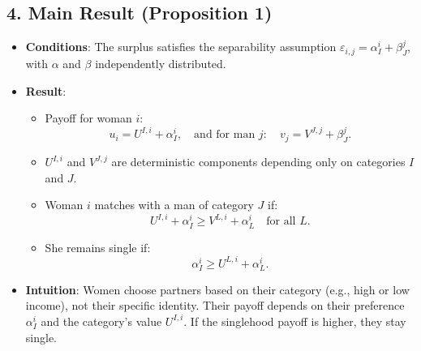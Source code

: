 \subsection*{4. Main Result (Proposition 1)}
\begin{itemize}
    \item \textbf{Conditions}: The surplus satisfies the separability assumption \( \varepsilon_{i,j} = \alpha_I^i + \beta_J^j \), with \( \alpha \) and \( \beta \) independently distributed.
    \item \textbf{Result}:
    \begin{itemize}
        \item Payoff for woman \( i \): 
        \[
        u_i = U^{I,i} + \alpha_I^i, \quad \text{and for man } j: \quad v_j = V^{J,j} + \beta_J^j.
        \]
        \item \( U^{I,i} \) and \( V^{J,j} \) are deterministic components depending only on categories \( I \) and \( J \).
        \item Woman \( i \) matches with a man of category \( J \) if:
        \[
        U^{I,i} + \alpha_I^i \geq V^{L,i} + \alpha_L^i \quad \text{for all } L.
        \]
        \item She remains single if:
        \[
        \alpha_I^i \geq U^{L,i} + \alpha_L^i.
        \]
    \end{itemize}
    \item \textbf{Intuition}: Women choose partners based on their category (e.g., high or low income), not their specific identity. Their payoff depends on their preference \( \alpha_I^i \) and the category's value \( U^{I,i} \). If the singlehood payoff is higher, they stay single.
\end{itemize}

